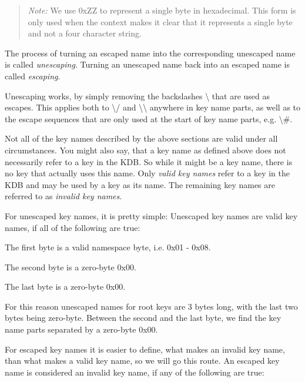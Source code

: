 \begin{quote}
{\itshape Note\+:} We use 0x\+ZZ to represent a single byte in hexadecimal. This form is only used when the context makes it clear that it represents a single byte and not a four character string. \end{quote}


The process of turning an escaped name into the corresponding unescaped name is called {\itshape unescaping}. Turning an unescaped name back into an escaped name is called {\itshape escaping}.

Unescaping works, by simply removing the backslashes {\ttfamily \textbackslash{}} that are used as escapes. This applies both to {\ttfamily \textbackslash{}/} and {\ttfamily \textbackslash{}\textbackslash{}} anywhere in key name parts, as well as to the escape sequences that are only used at the start of key name parts, e.\+g. {\ttfamily \textbackslash{}\#}.

Not all of the key names described by the above sections are valid under all circumstances. You might also say, that a key name as defined above does not necessarily refer to a key in the K\+DB. So while it might be a key name, there is no key that actually uses this name. Only {\itshape valid key names} refer to a key in the K\+DB and may be used by a key as its name. The remaining key names are referred to as {\itshape invalid key names}.

For unescaped key names, it is pretty simple\+: Unescaped key names are valid key names, if all of the following are true\+:


\begin{DoxyItemize}
\item The first byte is a valid namespace byte, i.\+e. {\ttfamily 0x01} -\/ {\ttfamily 0x08}.
\item The second byte is a zero-\/byte {\ttfamily 0x00}.
\item The last byte is a zero-\/byte {\ttfamily 0x00}.
\end{DoxyItemize}

For this reason unescaped names for root keys are 3 bytes long, with the last two bytes being zero-\/byte. Between the second and the last byte, we find the key name parts separated by a zero-\/byte {\ttfamily 0x00}.

For escaped key names it is easier to define, what makes an invalid key name, than what makes a valid key name, so we will go this route. An escaped key name is considered an invalid key name, if any of the following are true\+:


